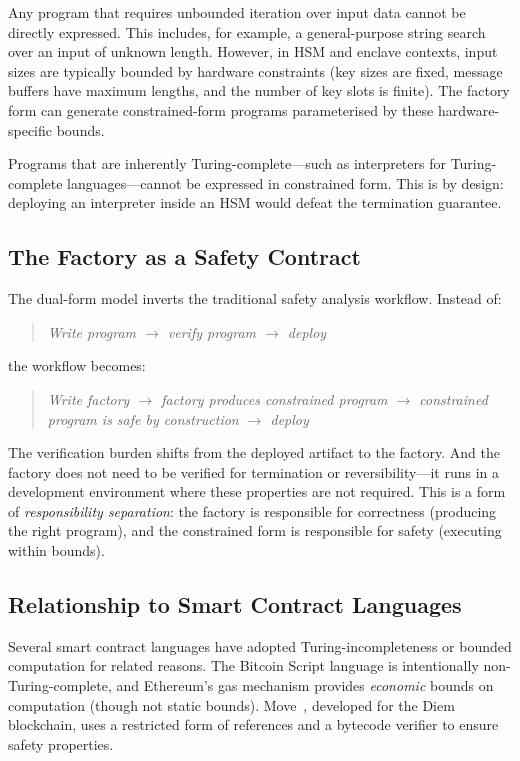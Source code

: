 \documentclass[11pt,a4paper]{article}
\begin{document}
Any program that requires unbounded iteration over input data cannot be
directly expressed.  This includes, for example, a general-purpose string
search over an input of unknown length.  However, in HSM and enclave
contexts, input sizes are typically bounded by hardware constraints (key sizes
are fixed, message buffers have maximum lengths, and the number of key slots
is finite).  The factory form can generate constrained-form programs
parameterised by these hardware-specific bounds.

Programs that are inherently Turing-complete---such as interpreters for
Turing-complete languages---cannot be expressed in constrained form.  This is
by design: deploying an interpreter inside an HSM would defeat the
termination guarantee.

\subsection{The Factory as a Safety Contract}

The dual-form model inverts the traditional safety analysis workflow.
Instead of:
\begin{quote}
  \emph{Write program $\to$ verify program $\to$ deploy}
\end{quote}
the workflow becomes:
\begin{quote}
  \emph{Write factory $\to$ factory produces constrained program
  $\to$ constrained program is safe by construction $\to$ deploy}
\end{quote}

The verification burden shifts from the deployed artifact to the factory.
And the factory does not need to be verified for termination or
reversibility---it runs in a development environment where these properties
are not required.  This is a form of \emph{responsibility separation}:
the factory is responsible for correctness (producing the right program), and
the constrained form is responsible for safety (executing within bounds).

\subsection{Relationship to Smart Contract Languages}

Several smart contract languages have adopted Turing-incompleteness or
bounded computation for related reasons.  The Bitcoin Script language is
intentionally non-Turing-complete, and Ethereum's gas mechanism provides
\emph{economic} bounds on computation (though not static bounds).
Move~\citep{blackshear2019move}, developed for the Diem blockchain, uses a
restricted form of references and a bytecode verifier to ensure safety
properties.
\end{document}
